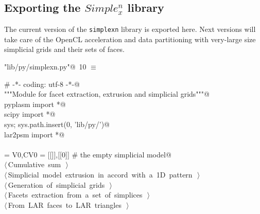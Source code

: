 \documentclass[11pt,oneside]{article}	%
\begin{document}


\subsection{Exporting the $Simple_x^n$ library}
The current version of the \texttt{simplexn} library is exported here. Next versions will take care of the OpenCL acceleration and data partitioning with very-large size simplicial grids and their sets of faces.

\begin{flushleft} \small
\begin{minipage}{\linewidth} \label{scrap11}
\protect{}\verb@"lib/py/simplexn.py"@\nobreak\ {\footnotesize 10 }$\equiv$
\vspace{-1ex}
\begin{list}{}{} \item
\mbox{}\verb@# -*- coding: utf-8 -*-@\\
\mbox{}\verb@"""Module for facet extraction, extrusion and simplicial grids"""@\\
\mbox{}\verb@from pyplasm import *@\\
\mbox{}\verb@from scipy import *@\\
\mbox{}\verb@import sys; sys.path.insert(0, 'lib/py/')@\\
\mbox{}\verb@from lar2psm import *@\\
\mbox{}\verb@@\\
\mbox{}\verb@VOID = V0,CV0 = [[]],[[0]]    # the empty simplicial model@\\
\mbox{}\verb@@\hbox{$\langle\,$Cumulative sum\nobreak\ {\footnotesize {}}$\,\rangle$}\verb@@\\
\mbox{}\verb@@\hbox{$\langle\,$Simplicial model extrusion in accord with a 1D pattern\nobreak\ {\footnotesize {}}$\,\rangle$}\verb@@\\
\mbox{}\verb@@\hbox{$\langle\,$Generation of simplicial grids\nobreak\ {\footnotesize {}}$\,\rangle$}\verb@@\\
\mbox{}\verb@@\hbox{$\langle\,$Facets extraction from a set of simplices\nobreak\ {\footnotesize {}}$\,\rangle$}\verb@@\\
\mbox{}\verb@@\hbox{$\langle\,$From LAR faces to LAR triangles\nobreak\ {\footnotesize {}}$\,\rangle$}\verb@@\\

\end{list}
\end{minipage}
\end{flushleft}
\end{document}
